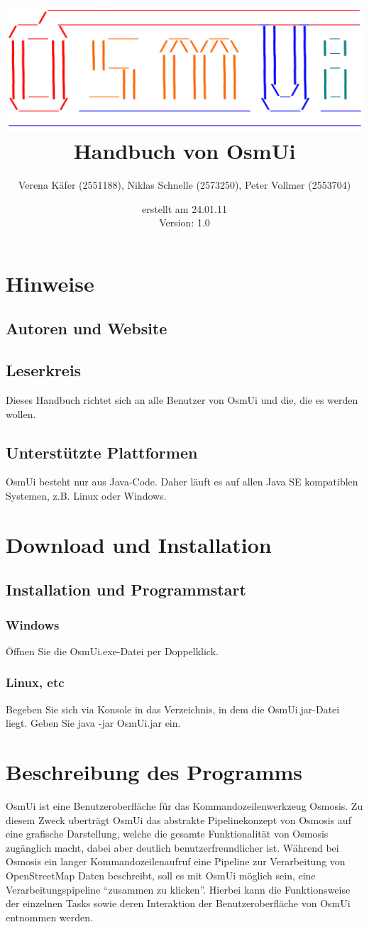 \documentclass[a4paper,10pt]{scrartcl}
\author{Verena Käfer (2551188), Niklas Schnelle (2573250), Peter Vollmer (2553704)}
\date{erstellt am 24.01.11\\
Version: 1.0}
\title{\includegraphics[width=15cm]{../projektplan/Logo_Osmui.png} \\ 
Handbuch von OsmUi}
\begin{document}
\maketitle
\newpage
\tableofcontents
\newpage

\section{Hinweise}
\subsection{Autoren und Website}
\subsection{Leserkreis}
Dieses Handbuch richtet sich an alle Benutzer von OsmUi und die, die es werden wollen.
\subsection{Unterstützte Plattformen}
OsmUi besteht nur aus Java-Code. Daher läuft es auf allen Java SE kompatiblen Systemen, z.B. Linux oder Windows.


\section{Download und Installation}
\subsection{Installation und Programmstart}
\subsubsection{Windows}
Öffnen Sie die OsmUi.exe-Datei per Doppelklick.
\subsubsection{Linux, etc}
Begeben Sie sich via Konsole in das Verzeichnis, in dem die OsmUi.jar-Datei liegt. Geben Sie java -jar OsmUi.jar ein. 

\section{Beschreibung des Programms}
OsmUi ist eine Benutzeroberfläche für das Kommandozeilenwerkzeug Osmosis. Zu diesem Zweck uberträgt OsmUi das abstrakte Pipelinekonzept von Osmosis auf eine grafische Darstellung, welche die gesamte Funktionalität von Osmosis zugänglich macht, dabei aber deutlich benutzerfreundlicher ist. Während bei Osmosis ein langer Kommandozeilenaufruf eine Pipeline zur Verarbeitung von OpenStreetMap Daten beschreibt, soll es mit OsmUi möglich sein, eine Verarbeitungspipeline “zusammen zu klicken”. Hierbei kann die Funktionsweise der einzelnen Tasks sowie deren Interaktion der Benutzeroberfläche von OsmUi entnommen werden.
\end{document}
